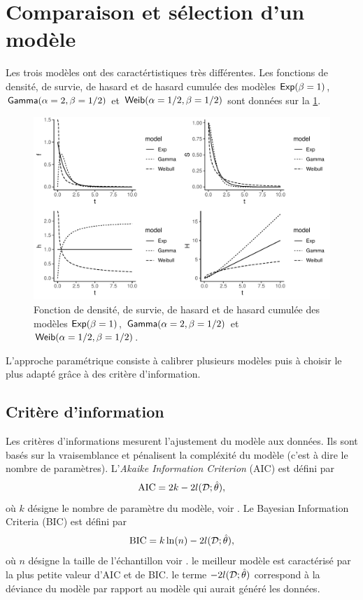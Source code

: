 \section{Comparaison et sélection d'un modèle}
Les trois modèles ont des caractértistiques très différentes. Les fonctions de densité, de survie, de hasard et de hasard cumulée des modèles $\mathsf{Exp}(\beta = 1)$, $\mathsf{Gamma}(\alpha = 2, \beta = 1/2)$ et $\mathsf{Weib}(\alpha = 1 / 2, \beta = 1/2)$ sont données sur la \cref{fig:d_S_h_H_parametric}.
\begin{figure}[h!]
\centering
\includegraphics[width = \textwidth]{../figures/d_S_h_H_parametric}
\caption{Fonction de densité, de survie, de hasard et de hasard cumulée des modèles $\mathsf{Exp}(\beta = 1)$, $\mathsf{Gamma}(\alpha = 2, \beta = 1/2)$ et $\mathsf{Weib}(\alpha = 1 / 2, \beta = 1/2)$.}
\label{fig:d_S_h_H_parametric}
\end{figure}
L'approche paramétrique consiste à calibrer
plusieurs modèles puis à choisir le plus adapté grâce à des critère d'information.
\subsection{Critère d'information}
Les critères d'informations mesurent l'ajustement du modèle aux données. Ils sont basés sur la vraisemblance et pénalisent la compléxité du modèle (c'est à dire le nombre de paramètres). L'\textit{Akaike Information Criterion} (AIC) est défini par 
$$
\text{AIC} = 2k - 2 l(\mathcal{D};\hat{\theta}),
$$
où $k$ désigne le nombre de paramètre du modèle, voir \citet{Akaike1998}. Le Bayesian Information Criteria (BIC) est défini par 
$$
\text{BIC} = k\ln(n) - 2 l(\mathcal{D};\hat{\theta}),
$$
où $n$ désigne la taille de l'échantillon voir \citet{Schwarz1978}. le meilleur modèle est caractérisé par la plus petite valeur d'AIC et de BIC. le terme $- 2 l(\mathcal{D};\hat{\theta})$ correspond à la déviance du modèle par rapport au modèle qui aurait généré les données. 

